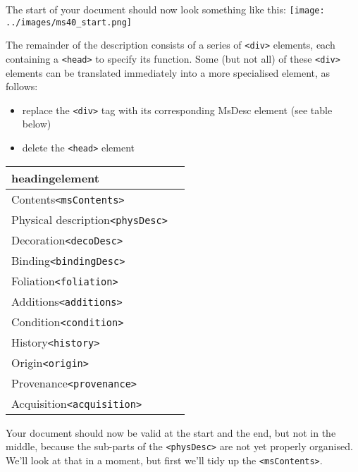 \documentclass[11pt,twoside]{article}\makeatletter
\begin{document}
The start of your document should now look something like this: \noindent\texttt{[image: ../images/ms40\_start.png]}\par
The remainder of the description consists of a series of \texttt{<div>} elements, each containing a \texttt{<head>} to specify its function. Some (but not all) of these \texttt{<div>} elements can be translated immediately into a more specialised element, as follows: \begin{itemize}
\item replace the \texttt{<div>} tag with its corresponding MsDesc element (see table below)
\item delete the \texttt{<head>} element
\end{itemize}   \par 
\begin{longtable}{P{0.2833333333333333\textwidth}P{0.5666666666666667\textwidth}}
\hline {}heading\tabcellsep element\\\hline 
Contents\tabcellsep \texttt{<msContents>}\\
Physical description\tabcellsep \texttt{<physDesc>}\\
Decoration\tabcellsep \texttt{<decoDesc>}\\
Binding\tabcellsep \texttt{<bindingDesc>}\\
Foliation\tabcellsep \texttt{<foliation>}\\
Additions\tabcellsep \texttt{<additions>}\\
Condition\tabcellsep \texttt{<condition>}\\
History\tabcellsep \texttt{<history>}\\
Origin\tabcellsep \texttt{<origin>}\\
Provenance\tabcellsep \texttt{<provenance>}\\
Acquisition\tabcellsep \texttt{<acquisition>}\end{longtable} \par
 \par
Your document should now be valid at the start and the end, but not in the middle, because the sub-parts of the \texttt{<physDesc>} are not yet properly organised. We'll look at that in a moment, but first we'll tidy up the \texttt{<msContents>}.
\end{document}
